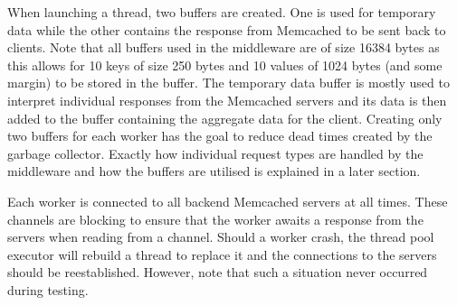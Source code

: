 \documentclass[11pt,a4paper]{article}
\begin{document}
When launching a thread, two buffers are created. One is used for temporary data while the other contains the response from Memcached to be sent back to clients. Note that all buffers used in the middleware are of size 16384 bytes as this allows for 10 keys of size 250 bytes and 10 values of 1024 bytes (and some margin) to be stored in the buffer. The temporary data buffer is mostly used to interpret individual responses from the Memcached servers and its data is then added to the buffer containing the aggregate data for the client. Creating only two buffers for each worker has the goal to reduce dead times created by the garbage collector. Exactly how individual request types are handled by the middleware and how the buffers are utilised is explained in a later section.

Each worker is connected to all backend Memcached servers at all times. These channels are blocking to ensure that the worker awaits a response from the servers when reading from a channel. Should a worker crash, the thread pool executor will rebuild a thread to replace it and the connections to the servers should be reestablished. However, note that such a situation never occurred during testing.
\end{document}
